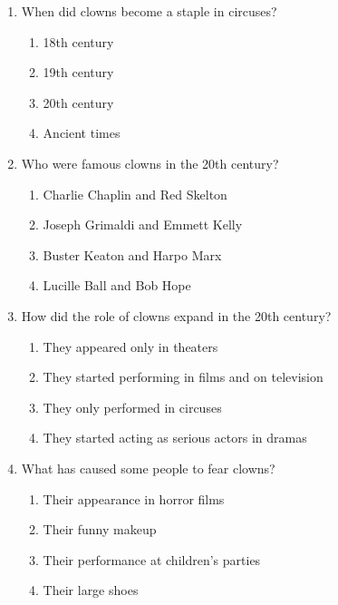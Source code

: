 \documentclass[12pt]{article}
\begin{document}
\begin{enumerate}
    \vspace{0.5cm}

    \item When did clowns become a staple in circuses?

    \begin{enumerate}[label=\Alph*.]
        \item 18th century
        \item 19th century
        \item 20th century
        \item Ancient times
    \end{enumerate}
    
    \vspace{0.5cm}

    \item Who were famous clowns in the 20th century?

    \begin{enumerate}[label=\Alph*.]
        \item Charlie Chaplin and Red Skelton
        \item Joseph Grimaldi and Emmett Kelly
        \item Buster Keaton and Harpo Marx
        \item Lucille Ball and Bob Hope
    \end{enumerate}
    
    \vspace{0.5cm}

    \item How did the role of clowns expand in the 20th century?

    \begin{enumerate}[label=\Alph*.]
        \item They appeared only in theaters
        \item They started performing in films and on television
        \item They only performed in circuses
        \item They started acting as serious actors in dramas
    \end{enumerate}
    
    \vspace{0.5cm}

    \item What has caused some people to fear clowns?

    \begin{enumerate}[label=\Alph*.]
        \item Their appearance in horror films
        \item Their funny makeup
        \item Their performance at children's parties
        \item Their large shoes
    \end{enumerate}
    

\end{enumerate}
\end{document}
